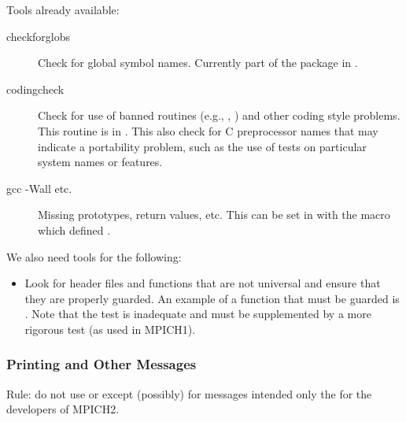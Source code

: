 \documentclass{article}
\begin{document}
Tools already available:
\begin{description}
\item[checkforglobs]Check for global symbol names.  Currently part of the
   package in . 
\item[codingcheck]Check for use of banned routines (e.g., ,
) and other coding style problems.  This routine is in
.  This also check for C preprocessor names that
may indicate a portability problem, such as the use of tests on
particular system names or features.


\item[gcc -Wall etc.]Missing prototypes, return values, etc.  This can be set
  in  with the  macro which
  defined .
\end{description}

We also need tools for the following:
\begin{itemize}
\item Look for header files and functions that are not universal and
  ensure that they are properly guarded.
  An example of a function that must be guarded is .
Note that the  test is inadequate and must be supplemented
by a more rigorous test (as used in MPICH1).
\end{itemize}

\subsubsection{Printing and Other Messages}
Rule: do not use  or  except (possibly) for
messages intended only the for the developers of MPICH2.
\end{document}
